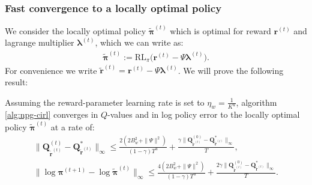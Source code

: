 \subsubsection{Fast convergence to a locally optimal policy}
\label{sec:NPG_CIRL_fast_conv_local_optimal}

We consider the locally optimal policy $\tilde{\bm{\pi}}^{(t)}$ which is optimal for reward $\bm{r}^{(t)}$ and lagrange multiplier $\bm{\lambda}^{(t)}$, which we can write as:
\begin{align*}
    \tilde{\bm{\pi}}^{(t)} := \text{RL}_\pi \bigl( \bm{r}^{(t)} - \Psi \bm{\lambda}^{(t)} \bigr).
\end{align*}
For convenience we write $\tilde{\bm{r}}^{(t)} = \bm{r}^{(t)} - \Psi \bm{\lambda}^{(t)}$. We will prove the following result:

\begin{lemma}
    \label{lemma:policy_converges_to_local_opt}
    Assuming the reward-parameter learning rate is set to $\eta_w = \frac{1}{K^u}$, algorithm \ref{alg:npg-cirl} converges in $Q$-values and in log policy error to the locally optimal policy $\tilde{\bm{\pi}}^{(t)}$ at a rate of:
    \begin{align*}
            \|\bm{Q}^{(t)}_{\tilde{\bm{r}}^{(t)}}
        - \bm{Q}^*_{\tilde{\bm{r}}^{(t)}} \|_\infty 
        \leq
        \frac{2(2 B_w^2+\|\Psi\|^2)}{(1 - \gamma)T^u}
        +
        \frac{\gamma 
        \|\bm{Q}^{(0)}_{\tilde{\bm{r}}^{(t)}}
        - \bm{Q}^*_{\tilde{\bm{r}}^{(t)}} \|_\infty
        }{T},\\
        \| \log \bm{\pi}^{(t+1)} - \log \tilde{\bm{\pi}}^{(t)} \|_\infty 
        \leq
        \frac{4(2 B_w^2+\|\Psi\|^2)}{(1 - \gamma)T^u} +
        \frac{2 \gamma 
        \|\bm{Q}^{(0)}_{\tilde{\bm{r}}^{(t)}}
        - \bm{Q}^*_{\tilde{\bm{r}}^{(t)}} \|_\infty
        }{T}.
    \end{align*}
\end{lemma}

